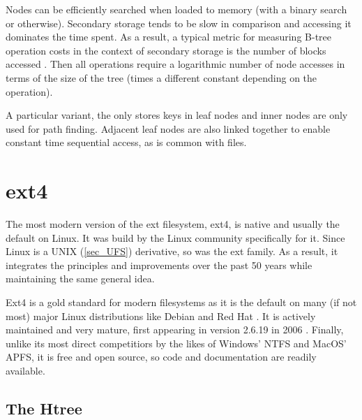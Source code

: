         Nodes can be efficiently searched when loaded to memory (with a binary
        search or otherwise). Secondary storage tends to be slow in comparison
        and accessing it dominates the time spent. As a result, a typical
        metric for measuring B-tree operation costs in the context of secondary
        storage is the number of blocks accessed \cite{btree_ubiquitous}. Then
        all operations require a logarithmic number of node accesses in terms
        of the size of the tree (times a different constant depending on the
        operation).

        A particular variant, the \bplustree only stores keys in leaf nodes and
        inner nodes are only used for path finding. Adjacent leaf nodes are
        also linked together to enable constant time sequential access, as is
        common with files.

    \section{ext4}
        \label{sec_ext4}

        The most modern version of the ext filesystem, ext4, is native and
        usually the default on Linux. It was build by the Linux community
        specifically for it. Since Linux is a UNIX (\ref{sec_UFS}) derivative,
        so was the ext family. As a result, it integrates the principles and
        improvements over the past 50 years while maintaining the same general
        idea.

        Ext4 is a gold standard for modern filesystems as it is the default on
        many (if not most) major Linux distributions like Debian
        \cite{Debian_filesystem} and Red Hat \cite{RedHat_filesystem}.  It is
        actively maintained \cite{ext4_mailing_list} and very mature, first
        appearing in version 2.6.19 in 2006 \cite{ext4_origin}. Finally, unlike
        its most direct competitiors by the likes of Windows' NTFS and MacOS'
        APFS, it is free and open source, so code and documentation are readily
        available.

        \subsection{The Htree}
            \label{sec_htree}

